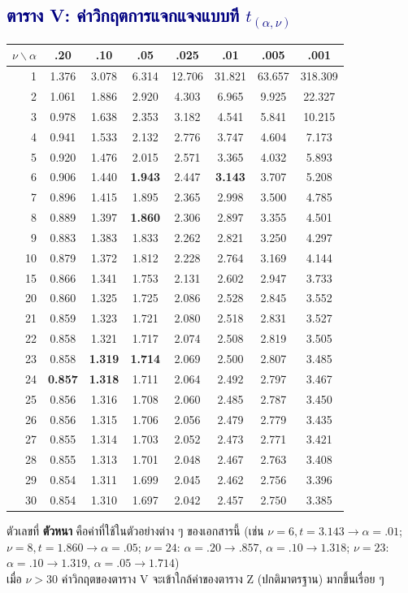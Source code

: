 \documentclass[9pt]{extarticle}
\begin{document}
\subsection*{\textcolor{navy}{ตาราง V: ค่าวิกฤตการแจกแจงแบบที $t_{(\alpha,\nu)}$}}
\begin{center}
{\small
\begin{tabular}{r|ccccccc}
\rowcolor{lightbg} $\nu\backslash\alpha$ & .20 & .10 & .05 & .025 & .01 & .005 & .001\\\hline
1 & 1.376 & 3.078 & 6.314 & 12.706 & 31.821 & 63.657 & 318.309\\
2 & 1.061 & 1.886 & 2.920 & 4.303 & 6.965 & 9.925 & 22.327\\
3 & 0.978 & 1.638 & 2.353 & 3.182 & 4.541 & 5.841 & 10.215\\
4 & 0.941 & 1.533 & 2.132 & 2.776 & 3.747 & 4.604 & 7.173\\
5 & 0.920 & 1.476 & 2.015 & 2.571 & 3.365 & 4.032 & 5.893\\
6 & 0.906 & 1.440 & \textbf{1.943} & 2.447 & \textbf{3.143} & 3.707 & 5.208\\
7 & 0.896 & 1.415 & 1.895 & 2.365 & 2.998 & 3.500 & 4.785\\
8 & 0.889 & 1.397 & \textbf{1.860} & 2.306 & 2.897 & 3.355 & 4.501\\
9 & 0.883 & 1.383 & 1.833 & 2.262 & 2.821 & 3.250 & 4.297\\
10 & 0.879 & 1.372 & 1.812 & 2.228 & 2.764 & 3.169 & 4.144\\
15 & 0.866 & 1.341 & 1.753 & 2.131 & 2.602 & 2.947 & 3.733\\
20 & 0.860 & 1.325 & 1.725 & 2.086 & 2.528 & 2.845 & 3.552\\
21 & 0.859 & 1.323 & 1.721 & 2.080 & 2.518 & 2.831 & 3.527\\
22 & 0.858 & 1.321 & 1.717 & 2.074 & 2.508 & 2.819 & 3.505\\
23 & 0.858 & \textbf{1.319} & \textbf{1.714} & 2.069 & 2.500 & 2.807 & 3.485\\
24 & \textbf{0.857} & \textbf{1.318} & 1.711 & 2.064 & 2.492 & 2.797 & 3.467\\
25 & 0.856 & 1.316 & 1.708 & 2.060 & 2.485 & 2.787 & 3.450\\
26 & 0.856 & 1.315 & 1.706 & 2.056 & 2.479 & 2.779 & 3.435\\
27 & 0.855 & 1.314 & 1.703 & 2.052 & 2.473 & 2.771 & 3.421\\
28 & 0.855 & 1.313 & 1.701 & 2.048 & 2.467 & 2.763 & 3.408\\
29 & 0.854 & 1.311 & 1.699 & 2.045 & 2.462 & 2.756 & 3.396\\
30 & 0.854 & 1.310 & 1.697 & 2.042 & 2.457 & 2.750 & 3.385\\
\end{tabular}
\par}
\end{center}
{\small ตัวเลขที่ \textbf{ตัวหนา} คือค่าที่ใช้ในตัวอย่างต่าง ๆ ของเอกสารนี้ (เช่น $\nu{=}6,t{=}3.143\to\alpha{=}.01$; $\nu{=}8,t{=}1.860\to\alpha{=}.05$; $\nu{=}24$: $\alpha{=}.20\to.857$, $\alpha{=}.10\to1.318$; $\nu{=}23$: $\alpha{=}.10\to1.319$, $\alpha{=}.05\to1.714$)\\[3pt]
เมื่อ $\nu>30$ ค่าวิกฤตของตาราง V จะเข้าใกล้ค่าของตาราง Z (ปกติมาตรฐาน) มากขึ้นเรื่อย ๆ}
\end{document}
